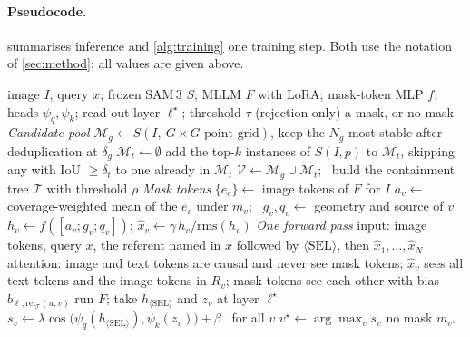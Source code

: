 \paragraph{Pseudocode.}
 summarises inference and \cref{alg:training} one training step. Both use the notation of
\cref{sec:method}; all values are given above.

\begin{algorithm*}[t]
\caption{Inference of \ours{} for one query}
\label{alg:inference}
\begin{algorithmic}[1]
\Require image $I$, query $x$; frozen SAM\,3 $S$; MLLM $F$ with LoRA; mask-token MLP $f$; heads $\psi_q,\psi_k$;
read-out layer $\ell^\star$; threshold $\tau$ (rejection only)
\Ensure a mask, or no mask
\Statex \textit{Candidate pool}
\State $\mathcal{M}_g \gets S(I,\ G{\times}G \text{ point grid})$, keep the $N_g$ most stable after deduplication at $\delta_g$
\State $\mathcal{M}_t \gets \emptyset$
  \State add the top-$k$ instances of $S(I,p)$ to $\mathcal{M}_t$, skipping any with IoU $\geq\delta_t$ to one already in $\mathcal{M}_t$
\EndFor
\State $\mathcal{V} \gets \mathcal{M}_g \cup \mathcal{M}_t$; \ build the containment tree $\mathcal{T}$ with threshold $\rho$
\Statex \textit{Mask tokens}
\State $\{e_c\} \gets$ image tokens of $F$ for $I$
  \State $a_v \gets$ coverage-weighted mean of the $e_c$ under $m_v$; \ $g_v, q_v \gets$ geometry and source of $v$
  \State $h_v \gets f([a_v; g_v; q_v])$; \quad $\hat{x}_v \gets \gamma\, h_v / \mathrm{rms}(h_v)$
\EndFor
\Statex \textit{One forward pass}
\State input: image tokens, query $x$, the referent named in $x$ followed by $\langle\mathrm{SEL}\rangle$, then $\hat{x}_1,\dots,\hat{x}_N$
\State attention: image and text tokens are causal and never see mask tokens; $\hat{x}_v$ sees all text tokens and
the image tokens in $R_v$; mask tokens see each other with bias $b_{\ell,\mathrm{rel}_{\mathcal{T}}(u,v)}$
\State run $F$; take $h_{\langle\mathrm{SEL}\rangle}$ and $z_v$ at layer $\ell^\star$
\State $s_v \gets \lambda \cos\!\big(\psi_q(h_{\langle\mathrm{SEL}\rangle}), \psi_k(z_v)\big) + \beta$ \ for all $v$
\State $v^\star \gets \arg\max_v s_v$
  \State \Return no mask
\EndIf
\State \Return $m_{v^\star}$
\end{algorithmic}
\end{algorithm*}

